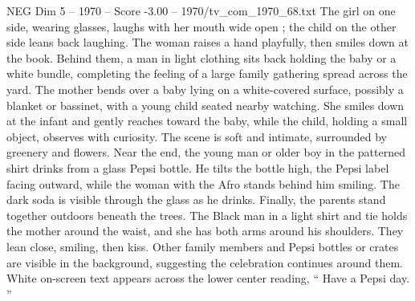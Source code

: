 \begin{textsample}{NEG Dim 5 – 1970 – Score -3.00 – 1970/tv\_com\_1970\_68.txt}
The girl on one side, wearing glasses, laughs with her mouth wide open ; the child on the other side leans back laughing.
The woman raises a hand playfully, then smiles down at the book.
Behind them, a man in light clothing sits back holding the baby or a white bundle, completing the feeling of a large family gathering spread across the yard.
The mother bends over a baby lying on a white-covered surface, possibly a blanket or bassinet, with a young child seated nearby watching.
She smiles down at the infant and gently reaches toward the baby, while the child, holding a small object, observes with curiosity.
The scene is soft and intimate, surrounded by greenery and flowers.
Near the end, the young man or older boy in the patterned shirt drinks from a glass Pepsi bottle.
He tilts the bottle high, the Pepsi label facing outward, while the woman with the Afro stands behind him smiling.
The dark soda is visible through the glass as he drinks.
Finally, the parents stand together outdoors beneath the trees.
The Black man in a light shirt and tie holds the mother around the waist, and she has both arms around his shoulders.
They lean close, smiling, then kiss.
Other family members and Pepsi bottles or crates are visible in the background, suggesting the celebration continues around them.
White on-screen text appears across the lower center reading, “ Have a Pepsi day. ”

\end{textsample}
